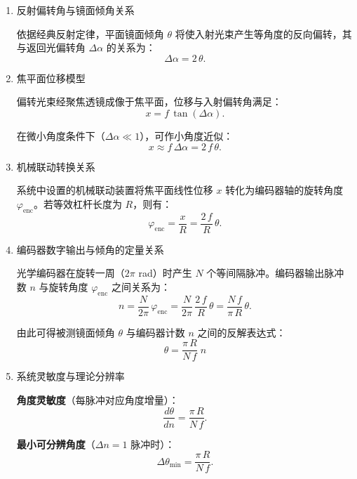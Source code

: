 \begin{enumerate}
	\item 反射偏转角与镜面倾角关系
	
	依据经典反射定律，平面镜面倾角 $\theta$ 将使入射光束产生等角度的反向偏转，其与返回光偏转角 $\Delta \alpha$ 的关系为：
	\begin{equation*}
		\Delta \alpha = 2\,\theta.
	\end{equation*}
	
	\item 焦平面位移模型
	
	偏转光束经聚焦透镜成像于焦平面，位移与入射偏转角满足：
	\begin{equation*}
		x = f\,\tan(\Delta \alpha).
	\end{equation*}
	
	在微小角度条件下（$\Delta\alpha \ll 1$），可作小角度近似：
	\begin{equation*}
		x \approx f\,\Delta \alpha = 2\,f\,\theta.
	\end{equation*}
	
	\item 机械联动转换关系
	
	系统中设置的机械联动装置将焦平面线性位移 $x$ 转化为编码器轴的旋转角度 $\varphi_{\mathrm{enc}}$。若等效杠杆长度为 $R$，则有：
	\begin{equation*}
		\varphi_{\mathrm{enc}} = \frac{x}{R} = \frac{2\,f}{R}\,\theta.
	\end{equation*}
	
	\item 编码器数字输出与倾角的定量关系
	
	光学编码器在旋转一周（$2\pi$ rad）时产生 $N$ 个等间隔脉冲。编码器输出脉冲数 $n$ 与旋转角度 $\varphi_{\mathrm{enc}}$ 之间关系为：
	\begin{equation*}
		n = \frac{N}{2\pi}\,\varphi_{\mathrm{enc}}
		= \frac{N}{2\pi}\,\frac{2\,f}{R}\,\theta
		= \frac{N\,f}{\pi\,R}\,\theta.
	\end{equation*}
	
	由此可得被测镜面倾角 $\theta$ 与编码器计数 $n$ 之间的反解表达式：
	\begin{equation*}
		\theta = \frac{\pi\,R}{N\,f}\;n
	\end{equation*}
	
	\item 系统灵敏度与理论分辨率
	
	\begin{uclaim}
		\textbf{角度灵敏度}（每脉冲对应角度增量）：
		\begin{equation*}
			\frac{d\theta}{dn} = \frac{\pi\,R}{N\,f}.
		\end{equation*}
	\end{uclaim}
	
	\begin{uclaim}
		\textbf{最小可分辨角度}（$\Delta n = 1$ 脉冲时）：
		\begin{equation*}
			\Delta \theta_{\min} = \frac{\pi\,R}{N\,f}.
		\end{equation*}
	\end{uclaim}
	
\end{enumerate}

